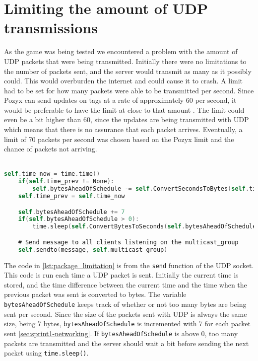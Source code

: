 \section{Limiting the amount of UDP transmissions}\label{sec:sprint5-transmissionlimit}
As the game was being tested we encountered a problem with the amount of UDP packets that were being transmitted.
Initially there were no limitations to the number of packets sent, and the server would transmit as many as it possibly could.
This would overburden the internet and could cause it to crash.
A limit had to be set for how many packets were able to be transmitted per second.
Since Pozyx can send updates on tags at a rate of approximately 60 per second, it would be preferable to have the limit at close to that amount \cite{pozyx-Performance}.
The limit could even be a bit higher than 60, since the updates are being transmitted with UDP which means that there is no assurance that each packet arrives.
Eventually, a limit of 70 packets per second was chosen based on the Pozyx limit and the chance of packets not arriving.
\\\\
\begin{lstlisting}[caption={Implementaion of the limit on the amount of packets that can be sent per second}, captionpos=b,language=C,label={lst:package_limitation}]
    self.time_now = time.time()
    if(self.time_prev != None):
        self.bytesAheadOfSchedule -= self.ConvertSecondsToBytes(self.time_now - self.time_prev)
    self.time_prev = self.time_now

    self.bytesAheadOfSchedule += 7
    if(self.bytesAheadOfSchedule > 0):
        time.sleep(self.ConvertBytesToSeconds(self.bytesAheadOfSchedule))

    # Send message to all clients listening on the multicast_group
    self.sendto(message, self.multicast_group)
\end{lstlisting}
The code in \autoref{lst:package_limitation} is from the \texttt{send} function of the UDP socket.
This code is run each time a UDP packet is sent.
Initially the current time is stored, and the time difference between the current time and the time when the previous packet was sent is converted to bytes.
The variable \texttt{bytesAheadOfSchedule} keeps track of whether or not too many bytes are being sent per second.
Since the size of the packets sent with UDP is always the same size, being 7 bytes, \texttt{bytesAheadOfSchedule} is incremented with 7 for each packet sent \autoref{sec:sprint1-networking}.
If \texttt{bytesAheadOfSchedule} is above 0, too many packets are transmitted and the server should wait a bit before sending the next packet using \texttt{time.sleep()}.
